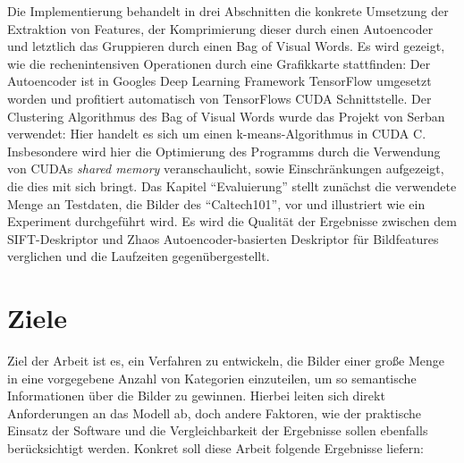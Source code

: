 Die Implementierung behandelt in drei Abschnitten die konkrete Umsetzung der Extraktion von Features, der Komprimierung dieser durch einen Autoencoder und letztlich das Gruppieren durch einen Bag of Visual Words. Es wird gezeigt, wie die  rechenintensiven Operationen durch eine Grafikkarte stattfinden: Der Autoencoder ist in Googles Deep Learning Framework TensorFlow umgesetzt worden und profitiert automatisch von TensorFlows CUDA Schnittstelle. Der Clustering Algorithmus des Bag of Visual Words wurde das Projekt von Serban verwendet: Hier handelt es sich um einen k-means-Algorithmus in CUDA C. Insbesondere wird hier die Optimierung des Programms durch die Verwendung von CUDAs \textit{shared memory} veranschaulicht, sowie Einschränkungen aufgezeigt, die dies mit sich bringt.\newline
Das Kapitel \enquote{Evaluierung} stellt zunächst die verwendete Menge an Testdaten, die Bilder des \enquote{Caltech101}, vor und illustriert wie ein Experiment durchgeführt wird. Es wird die Qualität der Ergebnisse zwischen dem SIFT-Deskriptor und Zhaos Autoencoder-basierten Deskriptor für Bildfeatures verglichen und die Laufzeiten gegenübergestellt.


\section{Ziele}

Ziel der Arbeit ist es, ein Verfahren zu entwickeln, die Bilder einer große Menge in eine vorgegebene Anzahl von Kategorien einzuteilen, um so semantische Informationen über die Bilder zu gewinnen. Hierbei leiten sich direkt Anforderungen an das Modell ab, doch andere Faktoren, wie der praktische Einsatz der Software und die Vergleichbarkeit der Ergebnisse sollen ebenfalls berücksichtigt werden. Konkret soll diese Arbeit folgende Ergebnisse liefern:

